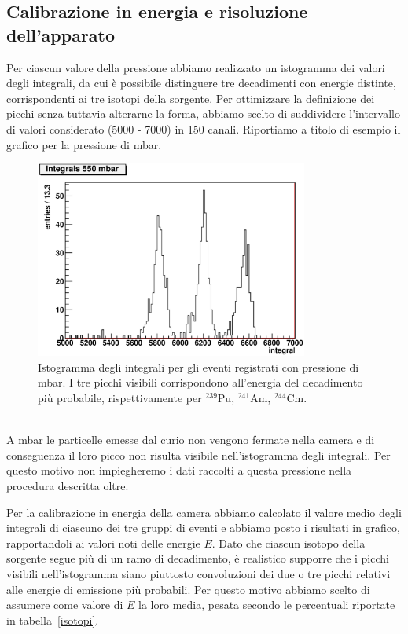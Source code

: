 \documentclass[italian,a4paper]{article}
\newcommand{\Am}{$^{241}$Am}
\newcommand{\Cm}{$^{244}$Cm}
\newcommand{\Pu}{$^{239}$Pu}
\begin{document}
\subsection{Calibrazione in energia e risoluzione dell'apparato}
Per ciascun valore della pressione abbiamo realizzato un istogramma dei valori degli integrali, da cui \`e possibile distinguere tre decadimenti con energie distinte, corrispondenti ai tre isotopi della sorgente.
Per ottimizzare la definizione dei picchi senza tuttavia alterarne la forma, abbiamo scelto di suddividere l'intervallo di valori considerato (5000 - 7000) in 150 canali.
Riportiamo a titolo di esempio il grafico per la pressione di \unit[550]{mbar}.
\begin{figure}[h!]\centering
\includegraphics[width=0.8\textwidth]{550_integral.eps}
\caption{Istogramma degli integrali per gli eventi registrati con pressione di \unit[550]{mbar}. I tre picchi visibili corrispondono all'energia del decadimento pi\`u probabile, rispettivamente per \Pu, \Am, \Cm.}
\label{int_hist}
\end{figure}\\
A \unit[400]{mbar} le particelle emesse dal curio non vengono fermate nella camera e di conseguenza il loro picco non risulta visibile nell'istogramma degli integrali. Per questo motivo non impiegheremo i dati raccolti a questa pressione nella procedura descritta oltre.

Per la calibrazione in energia della camera abbiamo calcolato il valore medio degli integrali di ciascuno dei tre gruppi di eventi e abbiamo posto i risultati in grafico, rapportandoli ai valori noti delle energie $E$.
Dato che ciascun isotopo della sorgente segue pi\`u di un ramo di decadimento, \`e realistico supporre che i picchi visibili nell'istogramma siano piuttosto convoluzioni dei due o tre picchi relativi alle energie di emissione pi\`u probabili. Per questo motivo abbiamo scelto di assumere come valore di $E$ la loro media, pesata secondo le percentuali riportate in tabella~\ref{isotopi}. 
\end{document}
